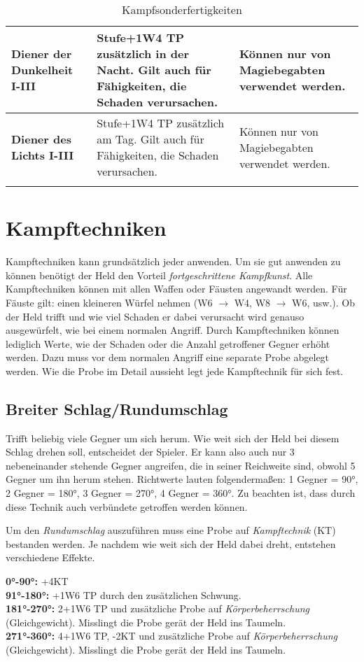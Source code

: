 \begin{longtable}{| p{4cm} | p{8cm} | p{3cm} |}
\hline
\textbf{Diener der Dunkelheit I-III} & Stufe+1W4 TP zusätzlich in der Nacht. Gilt auch für Fähigkeiten, die Schaden verursachen. & Können nur von Magiebegabten verwendet werden. \\

\hline
\textbf{Diener des Lichts I-III} & Stufe+1W4 TP zusätzlich am Tag. Gilt auch für Fähigkeiten, die Schaden verursachen. & Können nur von Magiebegabten verwendet werden. \\

\hline
\caption{Kampfsonderfertigkeiten}
\label{tab:Kampfsonderfertigkeiten}
\end{longtable}


\section{Kampftechniken}
Kampftechniken kann grundsätzlich jeder anwenden. Um sie gut anwenden zu können benötigt der Held den Vorteil \textit{fortgeschrittene Kampfkunst}. Alle Kampftechniken können mit allen Waffen oder Fäusten angewandt werden. Für Fäuste gilt: einen kleineren Würfel nehmen (W6 $\rightarrow$ W4, W8 $\rightarrow$ W6, usw.). Ob der Held trifft und wie viel Schaden er dabei verursacht wird genauso ausgewürfelt, wie bei einem normalen Angriff. Durch Kampftechniken können lediglich Werte, wie der Schaden oder die Anzahl getroffener Gegner erhöht werden. Dazu muss vor dem normalen Angriff eine separate Probe abgelegt werden. Wie die Probe im Detail aussieht legt jede Kampftechnik für sich fest.

\subsection{Breiter Schlag/Rundumschlag}
Trifft beliebig viele Gegner um sich herum. Wie weit sich der Held bei diesem Schlag drehen soll, entscheidet der Spieler. Er kann also auch nur 3 nebeneinander stehende Gegner angreifen, die in seiner Reichweite sind, obwohl 5 Gegner um ihn herum stehen. Richtwerte lauten folgendermaßen: 1 Gegner = 90°, 2 Gegner = 180°, 3 Gegner = 270°, 4 Gegner = 360°. Zu beachten ist, dass durch diese Technik auch verbündete getroffen werden können.

Um den \textit{Rundumschlag} auszuführen muss eine Probe auf \textit{Kampftechnik} (KT) bestanden werden. Je nachdem wie weit sich der Held dabei dreht, entstehen verschiedene Effekte.

\textbf{0°-90°:} +4KT \\
\textbf{91°-180°:} +1W6 TP durch den zusätzlichen Schwung. \\
\textbf{181°-270°:} 2+1W6 TP und zusätzliche Probe auf \textit{Körperbeherrschung} (Gleichgewicht). Misslingt die Probe gerät der Held ins Taumeln. \\
\textbf{271°-360°:} 4+1W6 TP, -2KT und zusätzliche Probe auf \textit{Körperbeherrschung} (Gleichgewicht). Misslingt die Probe gerät der Held ins Taumeln. \\

